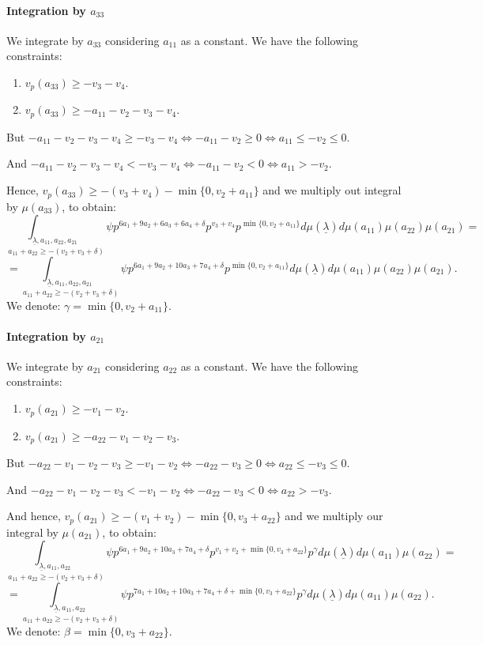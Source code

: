 \documentclass{article}
\begin{document}
\paragraph{Integration by $a_{33}$}
We integrate by $a_{33}$ considering $a_{11}$ as a constant. We have the following constraints:
\begin{enumerate}
    \item $v_p(a_{33})\geq-v_3-v_4$.
\item $v_p(a_{33})\geq-a_{11}-v_2-v_3-v_4$.
\end{enumerate}
But $-a_{11}-v_2-v_3-v_4\geq{-v_3-v_4}\iff{-a_{11}-v_2}\geq{0}\iff{a_{11}\leq-v_2\leq{0}}$.

And $-a_{11}-v_2-v_3-v_4<{-v_3-v_4}\iff{-a_{11}-v_2}<{0}\iff{a_{11}>-v_2}$.

Hence, $v_p(a_{33})\geq-(v_3+v_4)-\min\{0,v_2+a_{11}\}$ and we multiply out integral by $\mu(a_{33})$, to obtain:
\[\underset{a_{11}+a_{22}\geq-(v_2+v_3+\delta)}{\int_{\underline\lambda,a_{11},a_{22},a_{21}}}\psi{p}^{6a_1+9a_2+6a_3+6a_4+\delta}p^{v_3+v_4}p^{\min\{0,v_2+a_{11}\}}d\mu(\underline\lambda)d\mu(a_{11})\mu(a_{22})\mu(a_{21})=\]\[=\underset{a_{11}+a_{22}\geq-(v_2+v_3+\delta)}{\int_{\underline\lambda,a_{11},a_{22},a_{21}}}\psi{p}^{6a_1+9a_2+10a_3+7a_4+\delta}p^{\min\{0,v_2+a_{11}\}}d\mu(\underline\lambda)d\mu(a_{11})\mu(a_{22})\mu(a_{21}).
\]
We denote: $\gamma=\min\{0,v_2+a_{11}\}$.
\paragraph{Integration by $a_{21}$}
We integrate by $a_{21}$ considering $a_{22}$ as a constant. We have the following constraints:
\begin{enumerate}
\item $v_p(a_{21})\geq-v_1-v_2$.
    \item $v_p(a_{21})\geq-a_{22}-v_1-v_2-v_3$.
    \end{enumerate}
But $-a_{22}-v_1-v_2-v_3\geq{-v_1-v_2}\iff{-a_{22}-v_3}\geq{0}\iff{a_{22}\leq-v_3\leq{0}}$.

And $-a_{22}-v_1-v_2-v_3<{-v_1-v_2}\iff{-a_{22}-v_3}<{0}\iff{a_{22}>-v_3}$.

And hence, $v_p(a_{21})\geq-(v_1+v_2)-\min\{0,v_3+a_{22}\}$ and we multiply our integral by $\mu(a_{21})$, to obtain:
\[\underset{a_{11}+a_{22}\geq-(v_2+v_3+\delta)}{\int_{\underline\lambda,a_{11},a_{22}}}\psi{p}^{6a_1+9a_2+10a_3+7a_4+\delta}p^{v_1+v_2+\min\{0,v_3+a_{22}\}}p^{\gamma}d\mu(\underline\lambda)d\mu(a_{11})\mu(a_{22})=\]\[=\underset{a_{11}+a_{22}\geq-(v_2+v_3+\delta)}{\int_{\underline\lambda,a_{11},a_{22}}}\psi{p}^{7a_1+10a_2+10a_3+7a_4+\delta+\min\{0,v_3+a_{22}\}}p^{\gamma}d\mu(\underline\lambda)d\mu(a_{11})\mu(a_{22}).\]
We denote: $\beta=\min\{0,v_3+a_{22}\}$.
\end{document}
